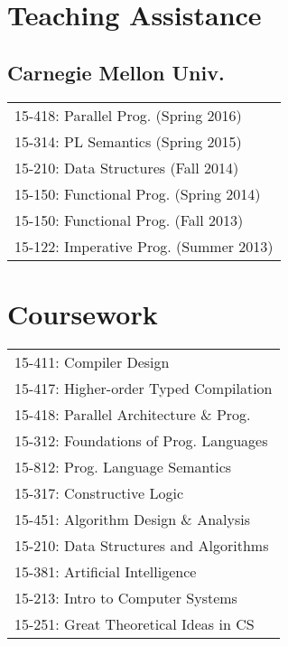 \documentclass[letterpaper]{deedy-resume} %
\begin{document}
\begin{minipage}[t]{0.33\textwidth}
\sectionspace %


\section{Teaching Assistance}
\subsection{Carnegie Mellon Univ.}

\begingroup
\renewcommand*{\arraystretch}{1.15}
\begin{tabular}{@{}l@{}}
15-418: Parallel Prog. (Spring 2016) \\
15-314: PL Semantics (Spring 2015) \\
15-210: Data Structures (Fall 2014) \\
15-150: Functional Prog. (Spring 2014) \\
15-150: Functional Prog. (Fall 2013) \\
15-122: Imperative Prog. (Summer 2013)
\end{tabular}
\endgroup

\sectionspace %


\section{Coursework}

\begingroup
\renewcommand*{\arraystretch}{1.15}
\begin{tabular}{@{}l@{}}
15-411: Compiler Design \\
15-417: Higher-order Typed Compilation \\
15-418: Parallel Architecture \& Prog. \\
15-312: Foundations of Prog. Languages \\
15-812: Prog. Language Semantics \\
15-317: Constructive Logic \\
15-451: Algorithm Design \& Analysis \\
15-210: Data Structures and Algorithms \\
15-381: Artificial Intelligence \\
15-213: Intro to Computer Systems \\
15-251: Great Theoretical Ideas in CS
\end{tabular}
\endgroup


\end{minipage}
\end{document}
